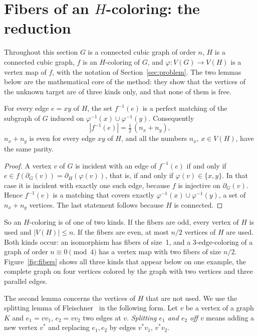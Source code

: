 \section{Fibers of an \texorpdfstring{$H$}{H}-coloring: the reduction}\label{sec:fibers}

Throughout this section $G$ is a connected cubic graph of order $n$, $H$ is a connected cubic graph, $f$ is an
$H$-coloring of $G$, and $\varphi : V(G) \to V(H)$ is a vertex map of $f$, with the notation of
Section~\ref{sec:problem}. The two lemmas below are the mathematical core of the method: they show that the
vertices of the unknown target are of three kinds only, and that none of them is free.

\begin{lemma}\label{lem:parity}
For every edge $e = xy$ of $H$, the set $f^{-1}(e)$ is a perfect matching of the subgraph of $G$
induced on $\varphi^{-1}(x) \cup \varphi^{-1}(y)$. Consequently
\begin{equation}\label{eq:parity}
|f^{-1}(e)| = \tfrac12\,(n_x + n_y),
\end{equation}
$n_x + n_y$ is even for every edge $xy$ of $H$, and all the numbers $n_x$, $x \in V(H)$, have the same parity.
\end{lemma}

\begin{proof}
A vertex $v$ of $G$ is incident with an edge of $f^{-1}(e)$ if and only if
$e \in f(\partial_G(v)) = \partial_H(\varphi(v))$, that is, if and only if
$\varphi(v) \in \{x, y\}$. In that case it is incident with exactly one such edge, because $f$ is
injective on $\partial_G(v)$. Hence $f^{-1}(e)$ is a matching that covers exactly
$\varphi^{-1}(x) \cup \varphi^{-1}(y)$, a set of $n_x + n_y$ vertices. The last statement follows
because $H$ is connected.
\end{proof}

So an $H$-coloring is of one of two kinds. If the fibers are odd, every vertex of $H$ is used and
$|V(H)| \le n$. If the fibers are even, at most $n/2$ vertices of $H$ are used. Both kinds occur:
an isomorphism has fibers of size~1, and a 3-edge-coloring of a graph of order $n \equiv 0
\pmod 4$ has a vertex map with two fibers of size $n/2$. Figure~\ref{fig:fibers} shows all three kinds that
appear below on one example, the complete graph on four vertices colored by the graph with two vertices and three
parallel edges.


The second lemma concerns the vertices of $H$ that are not used. We use the splitting lemma of
Fleischner~\cite{Fleischner1992} in the following form. Let $v$ be a vertex of a graph $K$ and
$e_1 = vv_1$, $e_2 = vv_2$ two edges at $v$. \emph{Splitting $e_1$ and $e_2$ off $v$} means adding
a new vertex $v^*$ and replacing $e_1, e_2$ by edges $v^*v_1$, $v^*v_2$.

